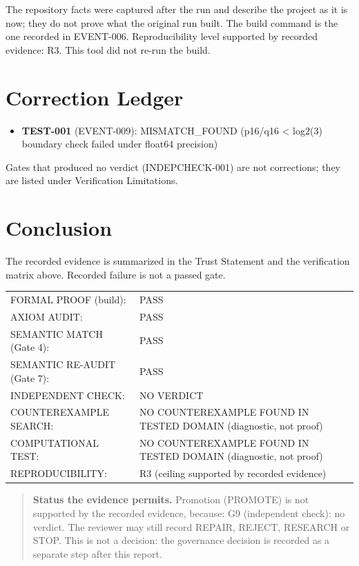 \documentclass[11pt]{article}
\begin{document}
The repository facts were captured after the run and describe the project as it is now; they do not prove what the original run built. The build command is the one recorded in EVENT-006.
Reproducibility level supported by recorded evidence: R3. This tool did not re-run the build.
\section{Correction Ledger}
\begin{itemize}
\item \textbf{TEST-001} (EVENT-009): MISMATCH\_FOUND (p16/q16 < log2(3) boundary check failed under float64 precision)
\end{itemize}
Gates that produced no verdict (INDEPCHECK-001) are not corrections; they are listed under Verification Limitations.


\section{Conclusion}
The recorded evidence is summarized in the Trust Statement and the verification matrix above. Recorded failure is not a passed gate.
\begin{center}\begin{tabular}{@{}p{}p{}@{}}
FORMAL PROOF (build): & PASS \\
AXIOM AUDIT: & PASS \\
SEMANTIC MATCH (Gate 4): & PASS \\
SEMANTIC RE-AUDIT (Gate 7): & PASS \\
INDEPENDENT CHECK: & NO VERDICT \\
COUNTEREXAMPLE SEARCH: & NO COUNTEREXAMPLE FOUND IN TESTED DOMAIN (diagnostic, not proof) \\
COMPUTATIONAL TEST: & NO COUNTEREXAMPLE FOUND IN TESTED DOMAIN (diagnostic, not proof) \\
REPRODUCIBILITY: & R3 (ceiling supported by recorded evidence) \\
\end{tabular}\end{center}
\begin{quote}\textbf{Status the evidence permits.} Promotion (PROMOTE) is not supported by the recorded evidence, because: G9 (independent check): no verdict. The reviewer may still record REPAIR, REJECT, RESEARCH or STOP. This is not a decision: the governance decision is recorded as a separate step after this report.\end{quote}
\appendix
\end{document}
